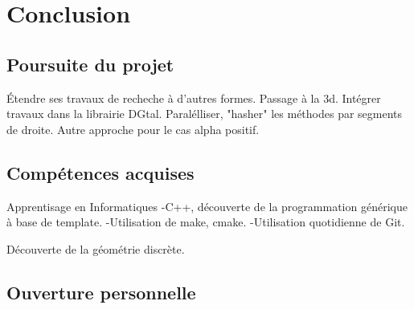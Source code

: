 \section{Conclusion}

\subsection{Poursuite du projet}

Étendre ses travaux de recheche à d'autres formes.
Passage à la 3d.
Intégrer travaux dans la librairie DGtal.
Paralélliser, "hasher" les méthodes par segments de droite.
Autre approche pour le cas alpha positif.

\subsection{Compétences acquises}

Apprentisage en Informatiques
-C++, découverte de la programmation générique à base de template.
-Utilisation de make, cmake.
-Utilisation quotidienne de Git.

Découverte de la géométrie discrète.

\subsection{Ouverture personnelle}



